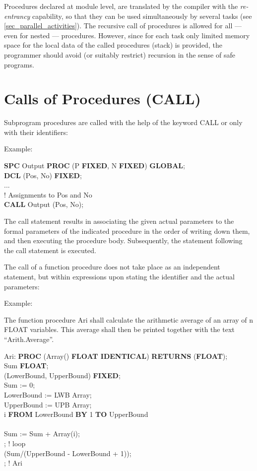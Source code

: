 Procedures declared at module level, are translated by the compiler with
the {\em re-entrancy} capability, so that they can be used
simultaneously by several tasks (see \ref{sec_parallel_activities}). The recursive call of
procedures is allowed for all --- even for nested --- procedures.
However, since for each task only limited memory space for the local
data of the called procedures (stack) is provided, the programmer
should avoid (or suitably restrict) recursion in the sense of safe
programs.

\section{Calls of Procedures (CALL)}   %
\label{sec_call}

Subprogram procedures are called with the help of the keyword CALL or
only with their identifiers:

 




Example:

{\bf SPC} Output {\bf PROC} (P {\bf FIXED}, N {\bf FIXED}) {\bf GLOBAL};\\
{\bf DCL} (Pos, No) {\bf FIXED};\\
...\\
! Assignments to Pos and No\\
{\bf CALL} Output (Pos, No);

The call statement results in associating the given actual parameters
to the formal parameters of the indicated procedure in the order of
writing down them, and then executing the procedure body. Subsequently,
the statement following the call statement is executed.

The call of a function procedure does not take place as an independent
statement, but within expressions upon stating the identifier and the
actual parameters:



Example:

The function procedure Ari shall calculate the arithmetic average of an
array of n FLOAT variables. This average shall then be printed together
with the text ``Arith.Average''.

Ari: {\bf PROC} (Array() {\bf FLOAT IDENTICAL}) {\bf RETURNS} ({\bf FLOAT});\\
\x {} Sum {\bf FLOAT};\\
\x {} (LowerBound, UpperBound) {\bf FIXED};\\
\x \x Sum := 0;\\
\x \x LowerBound := LWB Array; \\
\x \x UpperBound := UPB Array; \\
\x {} i {\bf FROM} LowerBound {\bf BY} 1 {\bf TO} UpperBound\\
\x {}\\
\x \x \x Sum := Sum + Array(i);\\
\x {}; ! loop\\
\x {} (Sum/(UpperBound - LowerBound + 1));\\
; ! Ari

